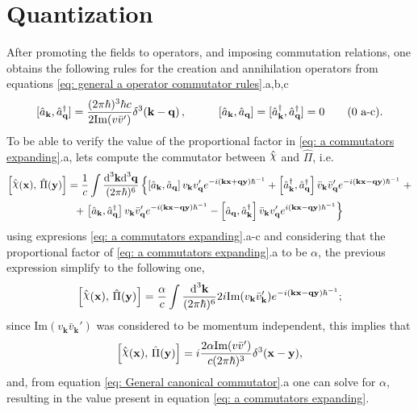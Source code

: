 \section{Quantization}
After promoting the fields to operators, and imposing commutation relations, one obtains the following rules for the creation and annihilation operators from equations \ref{eq: general a operator commutator rules}.a,b,c
\begin{subequations}\label{eq: a commutators expanding}
	\begin{gather}
		[\hat{a}_\mathbf{k},\hat{a}_\mathbf{q}^\dagger]=\frac{(2\pi\hbar)^3\hbar c}{2\text{Im}(v\bar v')}\delta^3(\mathbf{k}-\mathbf{q})\,,\hspace{1.0cm}[\hat{a}_\mathbf{k},\hat{a}_\mathbf{q}]=[\hat{a}_\mathbf{k}^\dagger,\hat{a}_\mathbf{q}^\dagger]=0\tag{\theequation \,\,a-c}.
	\end{gather}
\end{subequations}
To be able to verify the value of the proportional factor in \ref{eq: a commutators expanding}.a, lets compute the commutator between $\hat\rchi$ and $\hat\Pi$, i.e.
\begin{multline}
	\left[\hat{\rchi}(\mathbf{x}),\,\hat{\Pi}(\mathbf{y})\right]=\frac{1}{c}\int\frac{\td^3\mathbf{k}\td^3\mathbf{q}}{(2\pi\hbar)^6}\left\{\left[\hat{a}_\mathbf{k},\hat{a}_\mathbf{q}\right]v_\mathbf{k}v'_\mathbf{q}e^{-i\left(\mathbf{kx}+\mathbf{qy}\right)\hbar^{-1}}+\left[\hat{a}_\mathbf{k}^\dagger, \hat{a}_\mathbf{q}^\dagger\right]\bar v_\mathbf{k}\bar v_\mathbf{q}'e^{-i(\mathbf{kx}-\mathbf{qy})\hbar^{-1}}\right.+\\
	+\left.\left[\hat{a}_\mathbf{k},\hat{a}_\mathbf{q}^\dagger\right] v_\mathbf{k}\bar v'_\mathbf{q}e^{-i(\mathbf{kx}-\mathbf{qy})\hbar^{-1}}-\left[\hat{a}_\mathbf{q},\hat{a}_\mathbf{k}^\dagger\right]\bar v_\mathbf{k}v_\mathbf{q}'e^{i(\mathbf{kx}-\mathbf{qy})\hbar^{-1}}\right\}
\end{multline}
using expresions \ref{eq: a commutators expanding}.a-c and considering that the proportional factor of \ref{eq: a commutators expanding}.a to be $\alpha$, the previous expression simplify to the following one,
\begin{equation}
	\left[\hat{\rchi}(\mathbf{x}),\,\hat{\Pi}(\mathbf{y})\right]=\frac{\alpha}{c}\int\frac{\td^3\mathbf{k}}{(2\pi\hbar)^6}2i\text{Im}(v_\mathbf{k}\bar v_\mathbf{k}')e^{-i(\mathbf{kx}-\mathbf{qy})\hbar^{-1}};
\end{equation}
since $\text{Im}(v_\mathbf{k}\bar v_\mathbf{k}')$ was considered to be momentum independent, this implies that
\begin{equation}
	\left[\hat{\rchi}(\mathbf{x}),\,\hat{\Pi}(\mathbf{y})\right]=i\frac{2\alpha\text{Im}(v\bar v')}{c(2\pi\hbar)^3}\delta^3(\mathbf{x}-\mathbf{y}),
\end{equation}
and, from equation \ref{eq: General canonical commutator}.a one can solve for $\alpha$, resulting in the value present in equation \ref{eq: a commutators expanding}.

